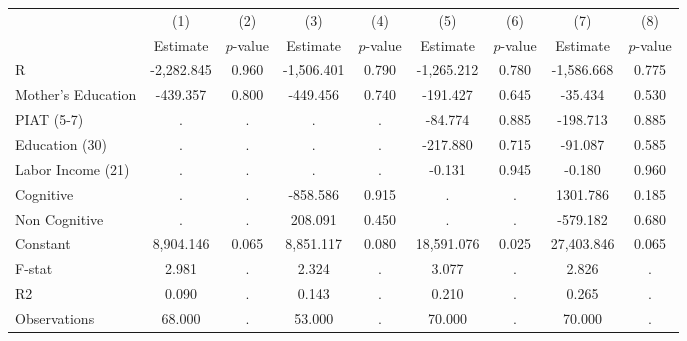 \begin{tabular}{lcccccccc} \toprule
 & (1) & (2) & (3) & (4) & (5) & (6) & (7) & (8) \\ 
 & Estimate  & $p$-value  & Estimate  & $p$-value  & Estimate  & $p$-value  & Estimate  & $p$-value  \\  \midrule
R & -2,282.845 &     0.960 & -1,506.401 &     0.790 & -1,265.212 &     0.780 & -1,586.668 &     0.775 \\  
Mother's Education &  -439.357 &     0.800 &  -449.456 &     0.740 &  -191.427 &     0.645 &   -35.434 &     0.530 \\  
PIAT (5-7) &         . &         . &         . &         . &   -84.774 &     0.885 &  -198.713 &     0.885 \\  
Education (30) &         . &         . &         . &         . &  -217.880 &     0.715 &   -91.087 &     0.585 \\  
Labor Income (21) &         . &         . &         . &         . &    -0.131 &     0.945 &    -0.180 &     0.960 \\  
Cognitive &         . &         . &  -858.586 &     0.915 &         . &         . &  1301.786 &     0.185 \\  
Non Cognitive &         . &         . &   208.091 &     0.450 &         . &         . &  -579.182 &     0.680 \\  
Constant &  8,904.146 &     0.065 &  8,851.117 &     0.080 & 18,591.076 &     0.025 & 27,403.846 &     0.065 \\  \midrule
F-stat &     2.981 &         . &     2.324 &         . &     3.077 &         . &     2.826 &         . \\  
R2 &     0.090 &         . &     0.143 &         . &     0.210 &         . &     0.265 &         . \\  
Observations &    68.000 &         . &    53.000 &         . &    70.000 &         . &    70.000 &         . \\  
\bottomrule \end{tabular}
